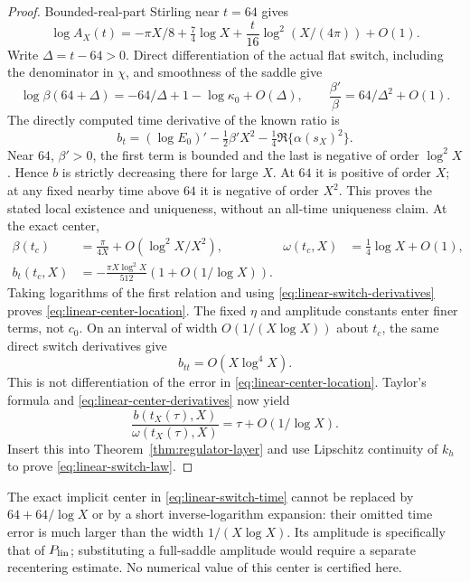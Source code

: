 \begin{proof}
Bounded-real-part Stirling near $t=64$ gives
\begin{equation}
 \log A_X(t)=-\pi X/8+\tfrac74\log X
       +\frac t{16}\log^2(X/(4\pi))+O(1).
 \label{eq:linear-center-amplitude}
\end{equation}
Write $\Delta=t-64>0$.  Direct differentiation of the actual flat
switch, including the denominator in $\chi$, and smoothness of the
saddle give
\begin{equation}
 \log\beta(64+\Delta)
   =-64/\Delta+1-\log\kappa_0+O(\Delta),\qquad
 \frac{\beta'}\beta=64/\Delta^2+O(1).
 \label{eq:linear-switch-derivatives}
\end{equation}
The directly computed time derivative of the known ratio is
\begin{equation}
 b_t=(\log E_0)'-\tfrac12\beta'X^2
                         -\tfrac14\Re\{\alpha(s_X)^2\}.
 \label{eq:linear-ratio-time-derivative}
\end{equation}
Near $64$, $\beta'>0$, the first term is bounded and the last is
negative of order $\log^2X$.  Hence $b$ is strictly decreasing there
for large $X$.  At $64$ it is positive of order $X$; at any fixed
nearby time above $64$ it is negative of order $X^2$.  This proves the
stated local existence and uniqueness, without an all-time uniqueness
claim.  At the exact center,
\begin{equation}
 \begin{aligned}
 \beta(t_c)&=\frac\pi{4X}+O(\log^2X/X^2),&
 \omega(t_c,X)&=\tfrac14\log X+O(1),\\
 b_t(t_c,X)&=-\frac{\pi X\log^2X}{512}
                   (1+O(1/\log X)).
 \end{aligned}
 \label{eq:linear-center-derivatives}
\end{equation}
Taking logarithms of the first relation and using
\eqref{eq:linear-switch-derivatives} proves
\eqref{eq:linear-center-location}.  The fixed $\eta$ and amplitude
constants enter finer terms, not $c_0$.
On an interval of width $O(1/(X\log X))$ about $t_c$, the same direct
switch derivatives give
\begin{equation}
 b_{tt}=O(X\log^4X).
 \label{eq:linear-switch-second-derivative}
\end{equation}
This is not differentiation of the error in
\eqref{eq:linear-center-location}. Taylor's formula and
\eqref{eq:linear-center-derivatives} now yield
\[
 \frac{b(t_X(\tau),X)}{\omega(t_X(\tau),X)}
       =\tau+O(1/\log X).
\]
Insert this into Theorem~\ref{thm:regulator-layer} and use Lipschitz
continuity of $k_h$ to prove \eqref{eq:linear-switch-law}.
\end{proof}
The exact implicit center in \eqref{eq:linear-switch-time} cannot be
replaced by $64+64/\log X$ or by a short inverse-logarithm expansion:
their omitted time error is much larger than the width
$1/(X\log X)$.  Its amplitude is specifically that of
$P_{\rm lin}$; substituting a full-saddle amplitude would require a
separate recentering estimate.  No numerical value of this center is
certified here.


